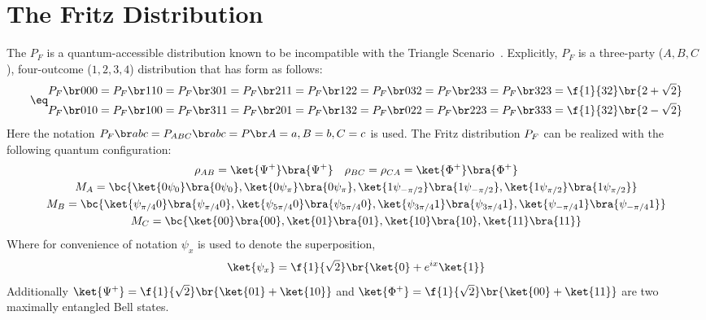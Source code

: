 \documentclass[aps, 10pt, english, twoside, pra, nofootinbib, longbibliography]{revtex4-1}
\begin{document}
    \section{The Fritz Distribution}
    \label{sec:fritz_dist}
    The  $P_F$ is a quantum-accessible distribution known to be incompatible with the Triangle Scenario~\cite{Fritz_2012}. Explicitly, $P_F$ is a three-party ($A,B,C$), four-outcome ($1,2,3,4$) distribution that has form as follows:
    \begin{align*}
    \eq \label{eq:fritz_dist}
    \begin{split}
    \prob[F][000] = \prob[F][110] = \prob[F][301] = \prob[F][211] = \prob[F][122] = \prob[F][032] = \prob[F][233] = \prob[F][323] &= \f{1}{32}\br{2 + \sqrt{2}} \\
    \prob[F][010] = \prob[F][100] = \prob[F][311] = \prob[F][201] = \prob[F][132] = \prob[F][022] = \prob[F][223] = \prob[F][333] &= \f{1}{32}\br{2 - \sqrt{2}}
    \end{split}
    \end{align*}
    Here the notation $\prob[F][abc] = \prob[ABC][abc] = \prob[][A=a,B=b,C=c]$ is used. The Fritz distribution $\prob[F]$ can be realized with the following quantum configuration:
    \begin{equation}
    \begin{gathered}
    \label{eq:fritz_quantum_realization}
    \rho_{AB} = \ket{\Psi^+}\bra{\Psi^+} \quad \rho_{BC} = \rho_{CA} = \ket{\gp^+}\bra{\gp^+} \\
    M_{A} = \bc{\ket{0\psi_0}\bra{0\psi_0}, \ket{0\psi_{\pi}}\bra{0\psi_{\pi}}, \ket{1\psi_{-\pi/2}}\bra{1\psi_{-\pi/2}}, \ket{1\psi_{\pi/2}}\bra{1\psi_{\pi/2}}} \\
    M_{B} = \bc{\ket{\psi_{\pi/4}0}\bra{\psi_{\pi/4}0}, \ket{\psi_{5\pi/4}0}\bra{\psi_{5\pi/4}0}, \ket{\psi_{3\pi/4}1}\bra{\psi_{3\pi/4}1}, \ket{\psi_{-\pi/4}1}\bra{\psi_{-\pi/4}1}} \\
    M_{C} = \bc{\ket{00}\bra{00}, \ket{01}\bra{01}, \ket{10}\bra{10}, \ket{11}\bra{11}}
    \end{gathered}
    \end{equation}
    Where for convenience of notation $\psi_x$ is used to denote the superposition,
    \[ \ket{\psi_x} = \f{1}{\sqrt{2}}\br{\ket{0} + e^{ix}\ket{1}} \]
    Additionally $\ket{\Psi^+} = \f{1}{\sqrt{2}}\br{\ket{01} + \ket{10}}$ and $\ket{\gp^+} = \f{1}{\sqrt{2}}\br{\ket{00} + \ket{11}}$ are two maximally entangled Bell states.
\end{document}

